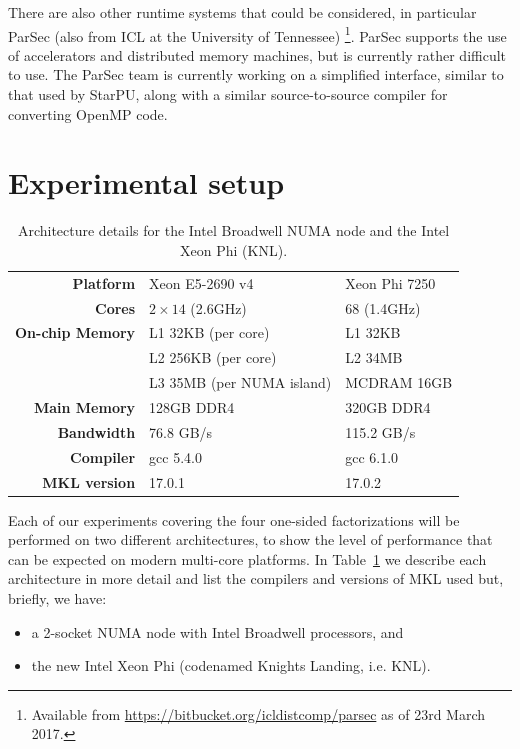 \documentclass[a4paper,12pt]{article}
\begin{document}
There are also other runtime systems that could be considered,
in particular ParSec (also from ICL at the University of Tennessee)%
\footnote{Available from
  \url{https://bitbucket.org/icldistcomp/parsec} as of 23rd March 2017.}.
ParSec supports the use of accelerators and distributed memory machines,
but is currently rather difficult to use.
The ParSec team is currently working on a simplified interface,
similar to that used by StarPU,
along with a similar source-to-source compiler for converting OpenMP code.

\section{Experimental setup}
\label{sec.arch}

\begin{table}[t]
  \centering
  \caption{Architecture details for the Intel Broadwell NUMA node and
    the Intel Xeon Phi (KNL).}
  \vspace{.5em}
  \begin{tabular}{|r | l | l |}
    \hline
    \textbf{Platform} & Xeon E5-2690 v4 & Xeon Phi 7250\\
    \textbf{Cores}    & $2 \times 14$ (2.6GHz) & 68 (1.4GHz)\\
    \textbf{On-chip Memory} & L1 32KB (per core) & L1 32KB\\
                      & L2 256KB (per core) & L2 34MB\\
                      & L3 35MB (per NUMA island)  & MCDRAM 16GB\\
    \textbf{Main Memory} & 128GB DDR4 & 320GB DDR4\\
    \textbf{Bandwidth} & 76.8 GB/s & 115.2 GB/s\\
    \textbf{Compiler} & gcc 5.4.0 & gcc 6.1.0\\
    \textbf{MKL version} & 17.0.1 & 17.0.2\\
    \hline
  \end{tabular}
  \label{tab.arch}
\end{table}

Each of our experiments covering the four one-sided factorizations
will be performed on two different architectures,
to show the level of performance that can be expected on
modern multi-core platforms.
In Table~\ref{tab.arch} we describe each architecture in more detail
and list the compilers and versions of MKL used but,
briefly, we have:
\begin{itemize}
\item a 2-socket NUMA node with Intel Broadwell processors, and
\item the new Intel Xeon Phi (codenamed Knights Landing, i.e. KNL).
\end{itemize}
\end{document}
